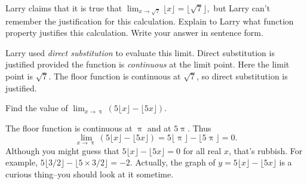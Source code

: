 \documentclass[12pt, answers,fleqn]{exam}
\begin{document}
\large


\vspace{0.1in}

\begin{questions} 

    \large


\question Larry claims that it is true that
$\displaystyle
    \lim_{x \to \sqrt{7}} \lfloor x \rfloor = \lfloor \sqrt{7} \rfloor,
$
but Larry can't remember the justification for this calculation. Explain to 
Larry what function property justifies this calculation. Write your answer in
sentence form.
\begin{solution} Larry used \emph{direct substitution} to evaluate this limit. Direct
    substitution is justified provided the function is \emph{continuous} at the limit 
    point.  Here the limit point is $\sqrt{7}$. The floor function is continuous 
    at $\sqrt{7}$, so direct substitution is justified.    
\end{solution}

\question Find the value of \(\displaystyle \lim_{x \to \uppi} 
\left(5 \lfloor x \rfloor -  \lfloor 5 x \rfloor  \right) \).
\begin{solution} The floor function is continuous at $\uppi$ and at $5 \uppi$. Thus
    \[
    \lim_{x \to \uppi} 
\left(5 \lfloor x \rfloor -  \lfloor 5 x \rfloor  \right) 
 = 5 \lfloor \uppi \rfloor -  \lfloor 5 \uppi \rfloor
 = 0.
    \]
Although you might guess that $5 \lfloor x \rfloor -  \lfloor 5 x \rfloor = 0$
for all real $x$, that's rubbish. For example, 
$5 \lfloor 3/2 \rfloor -  \lfloor 5 \times 3/2 \rfloor = -2$. Actually,
the graph of $y = 5 \lfloor x \rfloor -  \lfloor 5 x \rfloor$ is a curious
thing--you should look at it sometime.
\end{solution}


\end{questions}
\end{document}
